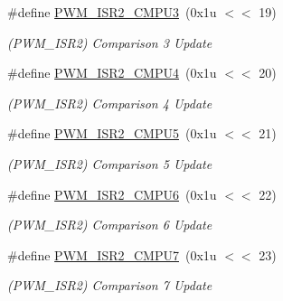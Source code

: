 \begin{DoxyCompactItemize}
\mbox{\label{group__SAME70__PWM_gae36833b4a117c2855f8a1f23aa6b7c21}} 
\#define \mbox{\hyperlink{group__SAME70__PWM_gae36833b4a117c2855f8a1f23aa6b7c21}{P\+W\+M\+\_\+\+I\+S\+R2\+\_\+\+C\+M\+P\+U3}}~(0x1u $<$$<$ 19)
\begin{DoxyCompactList}\small\item\em (P\+W\+M\+\_\+\+I\+S\+R2) Comparison 3 Update \end{DoxyCompactList}\item 
\mbox{\label{group__SAME70__PWM_gaba0de560e45856c32c10b0f8999d0638}} 
\#define \mbox{\hyperlink{group__SAME70__PWM_gaba0de560e45856c32c10b0f8999d0638}{P\+W\+M\+\_\+\+I\+S\+R2\+\_\+\+C\+M\+P\+U4}}~(0x1u $<$$<$ 20)
\begin{DoxyCompactList}\small\item\em (P\+W\+M\+\_\+\+I\+S\+R2) Comparison 4 Update \end{DoxyCompactList}\item 
\mbox{\label{group__SAME70__PWM_ga569332e5e110b0690938fe2dc211fa3c}} 
\#define \mbox{\hyperlink{group__SAME70__PWM_ga569332e5e110b0690938fe2dc211fa3c}{P\+W\+M\+\_\+\+I\+S\+R2\+\_\+\+C\+M\+P\+U5}}~(0x1u $<$$<$ 21)
\begin{DoxyCompactList}\small\item\em (P\+W\+M\+\_\+\+I\+S\+R2) Comparison 5 Update \end{DoxyCompactList}\item 
\mbox{\label{group__SAME70__PWM_ga62eebe660ee3605cf6488686a2aed84c}} 
\#define \mbox{\hyperlink{group__SAME70__PWM_ga62eebe660ee3605cf6488686a2aed84c}{P\+W\+M\+\_\+\+I\+S\+R2\+\_\+\+C\+M\+P\+U6}}~(0x1u $<$$<$ 22)
\begin{DoxyCompactList}\small\item\em (P\+W\+M\+\_\+\+I\+S\+R2) Comparison 6 Update \end{DoxyCompactList}\item 
\mbox{\label{group__SAME70__PWM_ga23f4a640d8df4bcf64a7be7bc7041f9d}} 
\#define \mbox{\hyperlink{group__SAME70__PWM_ga23f4a640d8df4bcf64a7be7bc7041f9d}{P\+W\+M\+\_\+\+I\+S\+R2\+\_\+\+C\+M\+P\+U7}}~(0x1u $<$$<$ 23)
\begin{DoxyCompactList}\small\item\em (P\+W\+M\+\_\+\+I\+S\+R2) Comparison 7 Update \end{DoxyCompactList}\item 
$$
\end{DoxyCompactItemize}
